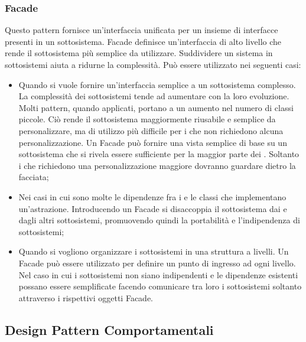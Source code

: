 \documentclass[12pt,a4paper]{article}
\begin{document}
\subsubsection{Facade}
Questo pattern fornisce un’interfaccia unificata per un insieme di interfacce presenti in un sottosistema. Facade definisce un’interfaccia di alto livello che rende il sottosistema più semplice da utilizzare. Suddividere un sistema in sottosistemi aiuta a ridurne la complessità. Può essere utilizzato nei seguenti casi:
\begin{itemize}
	\item Quando si vuole fornire un’interfaccia semplice a un sottosistema complesso. La complessità dei sottosistemi tende ad aumentare con la loro evoluzione. Molti pattern, quando applicati, portano a un aumento nel numero di classi piccole. Ciò rende il sottosistema maggiormente riusabile e semplice da personalizzare, ma di utilizzo più difficile per i  che non richiedono alcuna personalizzazione. Un Facade può fornire una vista semplice di base su un sottosistema che si rivela essere sufficiente per la maggior parte dei . Soltanto i  che richiedono una personalizzazione maggiore dovranno guardare dietro la facciata;
	\item Nei casi in cui sono molte le dipendenze fra i  e le classi che implementano un’astrazione. Introducendo un Facade si disaccoppia il sottosistema dai  e dagli altri sottosistemi, promuovendo quindi la portabilità e l’indipendenza di sottosistemi;
	\item Quando si vogliono organizzare i sottosistemi in una struttura a livelli. Un Facade può essere utilizzato per definire un punto di ingresso ad ogni livello. Nel caso in cui i sottosistemi non siano indipendenti e le dipendenze esistenti possano essere semplificate facendo comunicare tra loro i sottosistemi soltanto attraverso i rispettivi oggetti Facade.
\end{itemize}

\subsection{Design Pattern Comportamentali}
\end{document}

